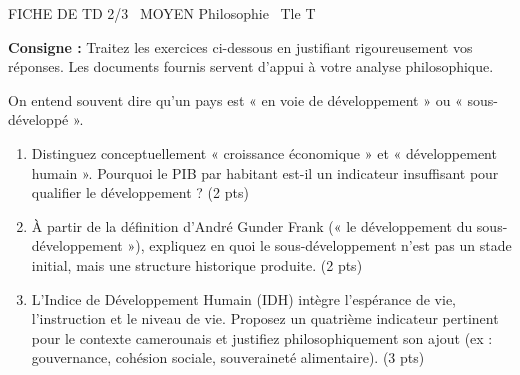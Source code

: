 \documentclass[11pt]{article}
\begin{document}
\begin{tcolorbox}[enhanced,colback=popink,colframe=popink,arc=10pt,boxrule=0pt,left=12pt,right=12pt,top=9pt,bottom=9pt]
{\color{white}\popxbold\small FICHE DE TD 2/3 \textbullet\ MOYEN \hfill Philosophie \textbullet\ Tle T\par}
\end{tcolorbox}
\vspace{4pt}
\noindent \textbf{Consigne :} Traitez les exercices ci-dessous en justifiant rigoureusement vos réponses. Les documents fournis servent d'appui à votre analyse philosophique.

\begin{exercice}
On entend souvent dire qu'un pays est « en voie de développement » ou « sous-développé ». 
\begin{enumerate}
    \item Distinguez conceptuellement « croissance économique » et « développement humain ». Pourquoi le PIB par habitant est-il un indicateur insuffisant pour qualifier le développement ? (2 pts)
    \item À partir de la définition d'André Gunder Frank (« le développement du sous-développement »), expliquez en quoi le sous-développement n'est pas un stade initial, mais une structure historique produite. (2 pts)
    \item L'Indice de Développement Humain (IDH) intègre l'espérance de vie, l'instruction et le niveau de vie. Proposez un quatrième indicateur pertinent pour le contexte camerounais et justifiez philosophiquement son ajout (ex : gouvernance, cohésion sociale, souveraineté alimentaire). (3 pts)
\end{enumerate}
\end{exercice}
\end{document}
